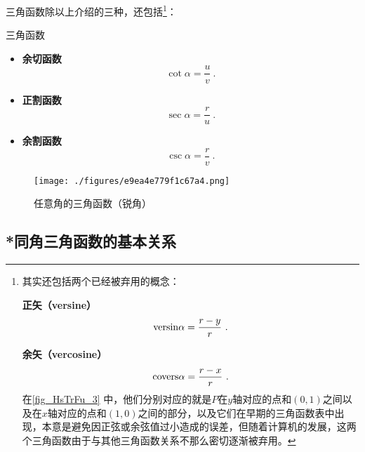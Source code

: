 三角函数除以上介绍的三种，还包括\footnote{其实还包括两个已经被弃用的概念：

\textbf{正矢（versine）}\begin{equation}
\mathrm{versin }\alpha=\displaystyle{r-y\over r}~.
\end{equation}

\textbf{余矢（vercosine）}
\begin{equation}
\mathrm{covers }\alpha=\displaystyle{r-x\over r}~.
\end{equation}
在\autoref{fig_HsTrFu_3} 中，他们分别对应的就是$P$在$y$轴对应的点和$(0,1)$之间以及在$x$轴对应的点和$(1,0)$之间的部分，以及它们在早期的三角函数表中出现，本意是避免因正弦或余弦值过小造成的误差，但随着计算机的发展，这两个三角函数由于与其他三角函数关系不那么密切逐渐被弃用。}：
\begin{definition}{三角函数}
\begin{itemize}
\item \textbf{余切函数}
\begin{equation}
\displaystyle\cot \alpha = \frac{u}{v}~.
\end{equation}
\item \textbf{正割函数}
\begin{equation}
\displaystyle\sec \alpha = \frac{r}{u}~.
\end{equation}
\item \textbf{余割函数}
\begin{equation}
\displaystyle\csc \alpha = \frac{r}{v}~.
\end{equation}
\end{itemize}
\end{definition}
\begin{figure}[ht]
\centering
\texttt{[image: ./figures/e9ea4e779f1c67a4.png]}
\caption{任意角的三角函数（锐角）} \label{fig_HsTrFu_3}
\end{figure}

\subsection{*同角三角函数的基本关系}

